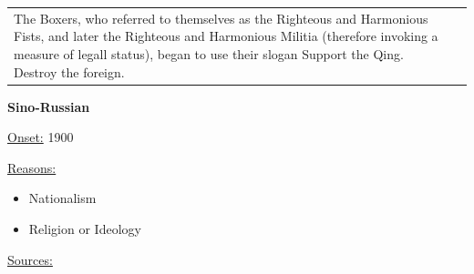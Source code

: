 {\begin{longtable}{p{}p{}}
The Boxers, who referred to themselves as the Righteous and Harmonious Fists, and later the Righteous and Harmonious Militia (therefore invoking a measure of legall status), began to use their slogan Support the Qing. Destroy the foreign.
\\
\end{longtable}}
\clearpage
         \textbf{Sino-Russian} 

          \underline{Onset:} 1900         

\underline{Reasons:}
\begin{itemize}
\item Nationalism
\item Religion or Ideology
\end{itemize}

         \underline{Sources:} 
